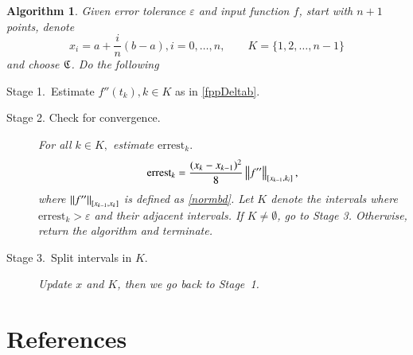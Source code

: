 \documentclass[review]{elsarticle}
\newtheorem{algo}{Algorithm}
\begin{document}
\begin{algo}
Given error tolerance $\varepsilon$ and input function $f$, start with $n+1$ points, denote 
$$x_i=a+\frac{i}{n}(b-a), i=0,\ldots,n, \qquad K = \{1,2,\ldots,n-1\}$$ and choose $\fC$. Do the following
\begin{description}
\item[Stage 1.\ Estimate $f''(t_k), k \in K $ as in \eqref{fppDeltab}.] \label{stage1}
\item[Stage 2. Check for convergence.]  \label{stage3}
For all $ k \in K,$ estimate $\text{errest}_k.$
\[
\text{errest}_k=\frac{(x_k-x_{k-1})^2}{8}\norm[{[x_{k-1},k_i]}]{f''},
\]
where $\norm[{[x_{k-1},x_k]}]{f''}$ is defined as \eqref{normbd}.
Let $ K$ denote the intervals where $\text{errest}_k > \varepsilon$ and their adjacent intervals.
If $K \ne \emptyset$, go to Stage 3.
Otherwise, return the algorithm and terminate.
\item[Stage 3.\ Split intervals in $K$.]\label{stage4} %
    Update $x$ and $K$, then we go back to Stage~1.

\end{description}
\end{algo}

\section*{References}


\end{document}
